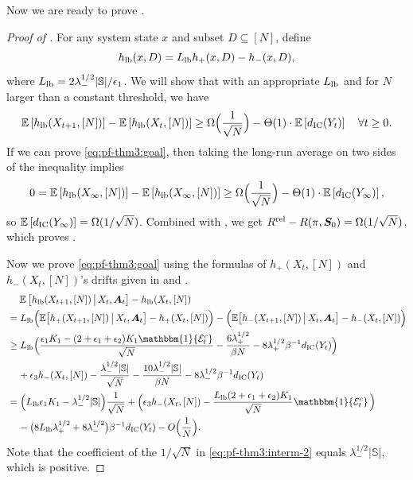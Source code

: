 \documentclass[11pt,letterpaper]{article}
\theoremstyle{plain}
\theoremstyle{definition}
\theoremstyle{remark}
\newcommand{\E}[1]{\mathbb{E}\left[#1\right]}
\newcommand{\Ebig}[1]{\mathbb{E}\big[#1\big]}
\newcommand{\givenbig}{\,\big|\,}
\newcommand{\indibrac}[1]{\mathbbm{1}\!\left\{#1\right\}}
\newcommand{\ve}[1]{\bm{#1}}
\newcommand{\veS}{\ve{S}}
\newcommand{\veA}{\ve{A}}
\newcommand{\sspa}{\mathbb{S}}
\newcommand{\rel}{\textup{rel}} %
\newcommand{\ravg}{R}
\newcommand{\rsysn}{\ravg(\pi, \veS_0)}
\newcommand{\rrel}{\ravg^\rel}
\newcommand{\disy}{d_{\textup{IC}}}
\newcommand{\gapus}{\epsilon_1} %
\newcommand{\gapusmax}{\epsilon_2}
\newcommand{\gapst}{\epsilon_3}
\newcommand{\subus}{+}%
\newcommand{\subst}{-}%
\newcommand{\hus}{h_{\subus}}
\newcommand{\hst}{h_{\subst}}
\newcommand{\lamus}{\lambda_{\subus}}
\newcommand{\lamst}{\lambda_{\subst}}
\newcommand{\goodevent}{\mathcal{E}}
\newcommand{\hlb}{h_{\textup{lb}}}
\newcommand{\ratiolb}{L_{\textup{lb}}}
\begin{document}
Now we are ready to prove . 

\begin{proof}[Proof of ]
    For any system state $x$ and subset $D\subseteq [N]$, 
    define
    \[
        \hlb(x, D) = \ratiolb \hus(x, D) - \hst(x, D),
    \]
    where $\ratiolb = 2\lamst^{1/2}|\sspa| / \gapus$. 
    We will show that with an appropriate $\ratiolb$ and for $N$ larger than a constant threshold, we have
    \begin{align}
        \label{eq:pf-thm3:goal}
        \E{\hlb(X_{t+1}, [N])} - \E{\hlb(X_{t}, [N])}
        \geq \Omega\Big(\frac{1}{\sqrt{N}}\Big) - \Theta(1)\cdot \E{\disy(Y_t)}  \quad \forall t\geq 0.
    \end{align}
    If we can prove \eqref{eq:pf-thm3:goal}, then taking the long-run average on two sides of the inequality implies 
    \begin{equation*}
        0 = \E{\hlb(X_{\infty}, [N])} - \E{\hlb(X_{\infty}, [N])} \geq \Omega\Big(\frac{1}{\sqrt{N}}\Big) - \Theta(1)\cdot \E{\disy(Y_\infty)},
    \end{equation*}
    so $\E{\disy(Y_\infty)} = \Omega(1/\sqrt{N})$. Combined with , we get $\rrel - \rsysn = \Omega(1/\sqrt{N})$, which proves . 

    Now we prove \eqref{eq:pf-thm3:goal} using the formulas of $\hus(X_t, [N])$ and $\hst(X_t, [N])$'s drifts given in  and . 
    \begin{align}
        \nonumber
        &\mspace{23mu} \E{\hlb(X_{t+1}, [N]) \givenbig X_t, \veA_t} - \hlb(X_{t}, [N]) \\
        \nonumber
        &= \ratiolb \Big(\Ebig{\hus(X_{t+1}, [N]) \givenbig X_t, \veA_t} - \hus(X_t, [N])\Big) - \Big( \Ebig{\hst(X_{t+1}, [N]) \givenbig X_t, \veA_t} - \hst(X_t, [N]) \Big) \\
        \nonumber
        &\geq \ratiolb \Big( \frac{\gapus K_1- (2+\gapus + \gapusmax) K_1 \indibrac{\goodevent_t^c}}{\sqrt{N}} - \frac{6\lamus^{1/2}}{\beta N} -  8 \lamus^{1/2} \beta^{-1} \disy(Y_t) \Big)  \\
        \nonumber
        &\mspace{20mu}
        + \gapst \hst(X_t, [N]) - \frac{\lamst^{1/2}|\sspa|}{\sqrt{N}} - \frac{10\lamst^{1/2}|\sspa|}{\beta N} - 8\lamst^{1/2} \beta^{-1} \disy(Y_t) \\
        \label{eq:pf-thm3:interm-2}
        &= \Big(\ratiolb \gapus K_1 - \lamst^{1/2}|\sspa|\Big)\frac{1}{\sqrt{N}} + \Big(\gapst \hst(X_t, [N]) - \frac{\ratiolb(2+\gapus+\gapusmax)K_1}{\sqrt{N}} \indibrac{\goodevent_t^c} \Big) \\
        \label{eq:pf-thm3:interm-3}
        &\mspace{20mu} - \big(8\ratiolb \lamus^{1/2} + 8\lamst^{1/2}\big)\beta^{-1} \disy(Y_t)  - O\Big(\frac{1}{N}\Big).
    \end{align}
    Note that the coefficient of the $1/\sqrt{N}$ in  \eqref{eq:pf-thm3:interm-2} equals $\lamst^{1/2}|\sspa|$, which is positive. 
    

\end{proof}
\end{document}
